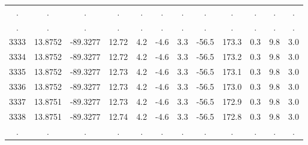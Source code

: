 \begin{table}
\begin{tabular}{cccccccccccc}
             . &                      . &                          . &                      . &                      . &                . &                . &               . &                . &                       . &                 . &              . \\
             . &                      . &                          . &                      . &                      . &                . &                . &               . &                . &                       . &                 . &              . \\
          3333 &                13.8752 &                   -89.3277 &                  12.72 &                    4.2 &             -4.6 &              3.3 &           -56.5 &            173.3 &                     0.3 &               9.8 &            3.0 \\
          3334 &                13.8752 &                   -89.3277 &                  12.72 &                    4.2 &             -4.6 &              3.3 &           -56.5 &            173.2 &                     0.3 &               9.8 &            3.0 \\
          3335 &                13.8752 &                   -89.3277 &                  12.73 &                    4.2 &             -4.6 &              3.3 &           -56.5 &            173.1 &                     0.3 &               9.8 &            3.0 \\
          3336 &                13.8752 &                   -89.3277 &                  12.73 &                    4.2 &             -4.6 &              3.3 &           -56.5 &            173.0 &                     0.3 &               9.8 &            3.0 \\
          3337 &                13.8751 &                   -89.3277 &                  12.73 &                    4.2 &             -4.6 &              3.3 &           -56.5 &            172.9 &                     0.3 &               9.8 &            3.0 \\
          3338 &                13.8751 &                   -89.3277 &                  12.74 &                    4.2 &             -4.6 &              3.3 &           -56.5 &            172.8 &                     0.3 &               9.8 &            3.0 \\
             . &                      . &                          . &                      . &                      . &                . &                . &               . &                . &                       . &                 . &              . \\

\end{tabular}
\end{table}
